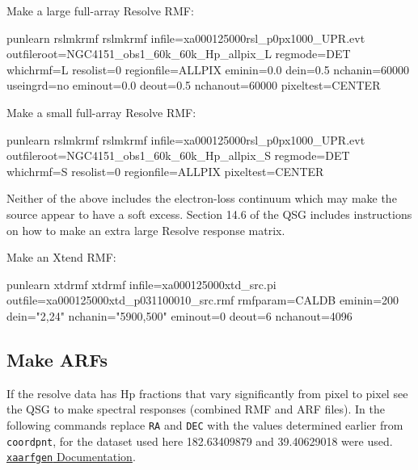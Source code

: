 \documentclass[
  letterpaper,
  DIV=11,
  numbers=noendperiod]{scrreprt}
\newenvironment{Shaded}{\begin{snugshade}}{\end{snugshade}}
\newcommand{\ExtensionTok}[1]{\textcolor[rgb]{0.00,0.23,0.31}{#1}}
\newcommand{\NormalTok}[1]{\textcolor[rgb]{0.00,0.23,0.31}{#1}}
\newcommand{\StringTok}[1]{\textcolor[rgb]{0.13,0.47,0.30}{#1}}
\begin{document}
Make a large full-array Resolve RMF:

\begin{Shaded}
\begin{Highlighting}[]
\ExtensionTok{punlearn}\NormalTok{ rslmkrmf}
\ExtensionTok{rslmkrmf}\NormalTok{ infile=xa000125000rsl\_p0px1000\_UPR.evt outfileroot=NGC4151\_obs1\_60k\_60k\_Hp\_allpix\_L regmode=DET whichrmf=L resolist=0 regionfile=ALLPIX eminin=0.0 dein=0.5 nchanin=60000 useingrd=no eminout=0.0 deout=0.5 nchanout=60000 pixeltest=CENTER}
\end{Highlighting}
\end{Shaded}

Make a small full-array Resolve RMF:

\begin{Shaded}
\begin{Highlighting}[]
\ExtensionTok{punlearn}\NormalTok{ rslmkrmf}
\ExtensionTok{rslmkrmf}\NormalTok{ infile=xa000125000rsl\_p0px1000\_UPR.evt outfileroot=NGC4151\_obs1\_60k\_60k\_Hp\_allpix\_S regmode=DET whichrmf=S resolist=0 regionfile=ALLPIX pixeltest=CENTER}
\end{Highlighting}
\end{Shaded}

Neither of the above includes the electron-loss continuum which may make
the source appear to have a soft excess. Section 14.6 of the QSG
includes instructions on how to make an extra large Resolve response
matrix.

Make an Xtend RMF:

\begin{Shaded}
\begin{Highlighting}[]
\ExtensionTok{punlearn}\NormalTok{ xtdrmf}
\ExtensionTok{xtdrmf}\NormalTok{ infile=xa000125000xtd\_src.pi outfile=xa000125000xtd\_p031100010\_src.rmf rmfparam=CALDB eminin=200 dein=}\StringTok{"2,24"}\NormalTok{ nchanin=}\StringTok{"5900,500"}\NormalTok{ eminout=0 deout=6 nchanout=4096}
\end{Highlighting}
\end{Shaded}

\subsection{Make ARFs}\label{make-arfs}

If the resolve data has Hp fractions that vary significantly from pixel
to pixel see the QSG to make spectral responses (combined RMF and ARF
files). In the following commands replace \texttt{RA} and \texttt{DEC}
with the values determined earlier from \texttt{coordpnt}, for the
dataset used here 182.63409879 and 39.40629018 were used.
\href{https://heasarc.gsfc.nasa.gov/docs/software/lheasoft/help/xaarfgen.html}{\texttt{xaarfgen}
Documentation}.
\end{document}
